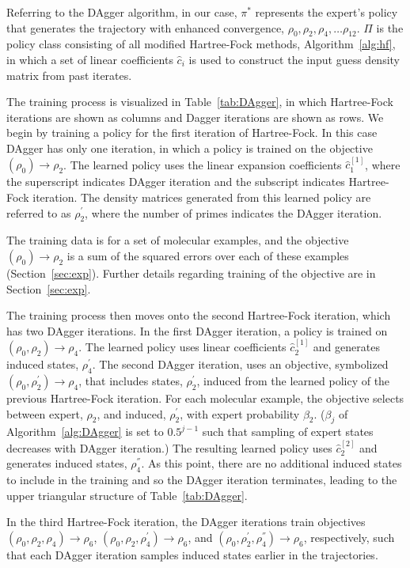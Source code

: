 \documentclass[twoside,11pt]{article}
\begin{document}
Referring to the DAgger algorithm, in our case, $\pi^*$ represents the expert's policy that generates the trajectory with enhanced convergence, $\rho_0, \rho_2,  \rho_4, \ldots \rho_{12}$. $\Pi$ is the policy class consisting of all modified Hartree-Fock methods, Algorithm~\ref{alg:hf}, in which a set of linear coefficients $\hat{c}_i$ is used to construct the input guess density matrix from past iterates.

The training process is visualized in Table~\ref{tab:DAgger}, in which Hartree-Fock iterations are shown as columns and Dagger iterations are shown as rows. We begin by training a policy for the first iteration of Hartree-Fock. In this case DAgger has only one iteration, in which a policy is trained on the objective $(\rho_0) \rightarrow \rho_2$. The learned policy uses the linear expansion coefficients $\hat{c}^{[1]}_1$, where the superscript indicates DAgger iteration and the subscript indicates Hartree-Fock iteration. The density matrices generated from this learned policy are referred to as $\rho_2^{'}$, where the number of primes indicates the DAgger iteration.

The training data is for a set of molecular examples, and the objective $(\rho_0) \rightarrow \rho_2$ is a sum of the squared errors over each of these examples (Section~\ref{sec:exp}). Further details regarding training of the objective are in Section~\ref{sec:exp}. 

The training process then moves onto the second Hartree-Fock iteration, which has two DAgger iterations. In the first DAgger iteration, a policy is trained on $(\rho_0, \rho_2) \rightarrow \rho_4$. The learned policy uses linear coefficients $\hat{c}^{[1]}_2$ and generates induced states, $\rho_4^{'}$. The second DAgger iteration, uses an objective, symbolized $(\rho_0, \rho_2^{'}) \rightarrow \rho_4$, that includes states, $\rho_2^{'}$, induced from the learned policy of the previous Hartree-Fock iteration. For each molecular example, the objective selects between expert, $\rho_2$, and induced, $\rho_2^{'}$, with expert probability $\beta_2$. ($\beta_j$ of Algorithm~\ref{alg:DAgger} is set to $0.5^{j-1}$ such that sampling of expert states decreases with DAgger iteration.) The resulting learned policy uses $\hat{c}^{[2]}_2$ and generates induced states, $\rho_4^{''}$. As this point, there are no additional induced states to include in the training and so the DAgger iteration terminates, leading to the upper triangular structure of Table~\ref{tab:DAgger}.

In the third Hartree-Fock iteration, the DAgger iterations train objectives $(\rho_0, \rho_2, \rho_4) \rightarrow \rho_6$, $(\rho_0, \rho_2, \rho_4^{'}) \rightarrow \rho_6$, and $(\rho_0, \rho_2^{'}, \rho_{4}^{''}) \rightarrow \rho_6$, respectively, such that each DAgger iteration samples induced states earlier in the trajectories.  
\end{document}

